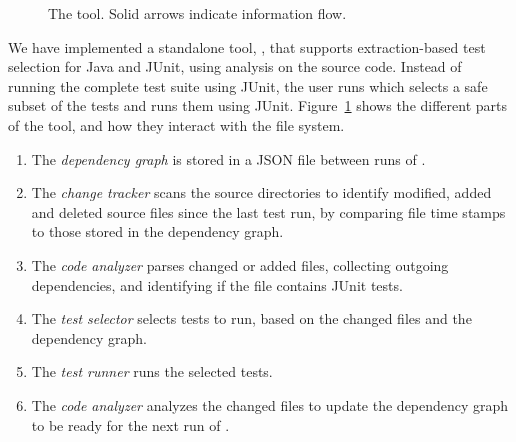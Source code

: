 {\begin{figure}
\begin{adjustbox}{max width=\linewidth}
{
}
\end{adjustbox}
  \caption{The \ourtool{} tool. Solid arrows indicate information flow.}
  \label{tool}
\end{figure}

We have implemented a standalone tool, \ourtool{}, that supports extraction-based test selection for Java and JUnit, using analysis on the source code. Instead of running the complete test suite using JUnit, the user runs \ourtool{} which selects a safe subset of the tests and runs them using JUnit. Figure~\ref{tool} shows the different parts of the tool, and how they interact with the file system.

\begin{enumerate}
\item The \emph{dependency graph} is stored in a JSON file between runs of \ourtool{}.
\item The \emph{change tracker} scans the source directories to identify modified, added and deleted
  source files since the last test run, by comparing file time stamps to those stored in the dependency graph.
\item The \emph{code analyzer} parses changed or added files, collecting outgoing dependencies, and
  identifying if the file contains JUnit tests.
\item The \emph{test selector} selects tests to run, based on the changed files and the dependency graph.
\item The \emph{test runner} runs the selected tests.
\item The \emph{code analyzer} analyzes the changed files to update the dependency graph to be ready for the next run of \ourtool{}.
\end{enumerate}

}
